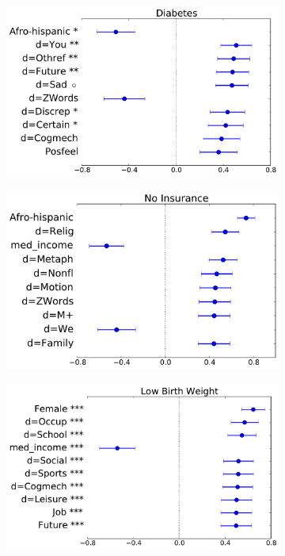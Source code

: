 \begin{figure}
\begin{subfigure}[b]{0.33\textwidth}
\label{fig.unemployed}
\end{subfigure}
\begin{subfigure}[b]{0.33\textwidth}
\centering
\includegraphics[width=\columnwidth,height=.6\columnwidth]{figs/hba1c}
\label{fig.hba1c}
\end{subfigure}
\begin{subfigure}[b]{0.33\textwidth}
\centering
\includegraphics[width=\columnwidth,height=.6\columnwidth]{figs/uninsured}
\label{fig.uninsured}
\end{subfigure}
\begin{subfigure}[b]{0.33\textwidth}
\centering
\includegraphics[width=\columnwidth,height=.6\columnwidth]{figs/lowbirthweight}

\end{subfigure}
\end{figure}
